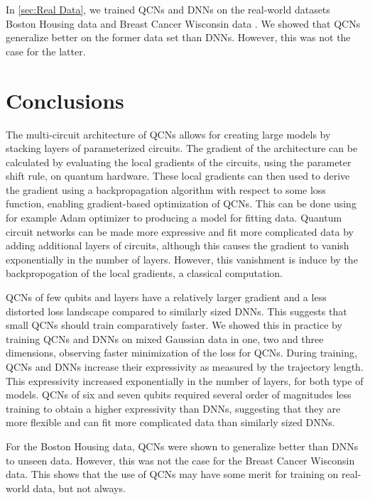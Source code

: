 In \cref{sec:Real Data}, we trained QCNs and DNNs on the real-world datasets Boston Housing data \cite{boston} and Breast Cancer Wisconsin data \cite{cancer}. We showed that QCNs generalize better on the former data set than DNNs. However, this was not the case for the latter.  


\section{Conclusions}\label{sec:conclusion}
The multi-circuit architecture of QCNs allows for creating large models by stacking layers of parameterized circuits. The gradient of the architecture can be calculated by evaluating the local gradients of the circuits, using the parameter shift rule, on quantum hardware. These local gradients can then used to derive the gradient using a backpropagation algorithm with respect to some loss function, enabling gradient-based optimization of QCNs. This can be done using for example Adam optimizer to producing a model for fitting data. Quantum circuit networks can be made more expressive and fit more complicated data by adding additional layers of circuits, although this causes the gradient to vanish exponentially in the number of layers. However, this vanishment is induce by the backpropogation of the local gradients, a classical computation.  


QCNs of few qubits and layers have a relatively larger gradient and a less distorted loss landscape compared to similarly sized DNNs. This suggests that small QCNs should train comparatively faster. We showed this in practice by training QCNs and DNNs on mixed Gaussian data in one, two and three dimensions, observing faster minimization of the loss for QCNs. During training, QCNs and DNNs increase their expressivity as measured by the trajectory length. This expressivity increased exponentially in the number of layers, for both type of models. QCNs of six and seven qubits required several order of magnitudes less training to obtain a higher expressivity than DNNs, suggesting that they are more flexible and can fit more complicated data than similarly sized DNNs.

For the Boston Housing data, QCNs were shown to generalize better than DNNs to unseen data. However, this was not the case for the Breast Cancer Wisconsin data. This shows that the use of QCNs may have some merit for training on real-world data, but not always.

